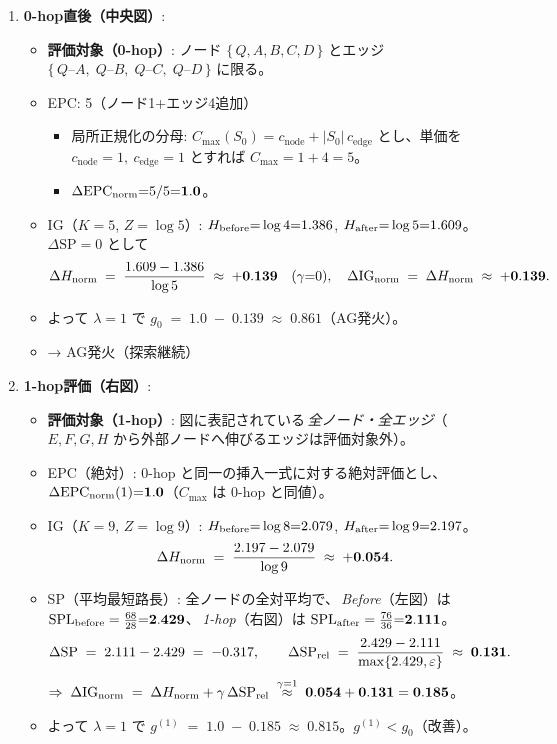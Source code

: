 \documentclass[ja=standard,xelatex]{bxjsarticle}
\begin{document}
\begin{enumerate}
  \item \textbf{0-hop直後（中央図）}: 
  \begin{itemize}
    \item \textbf{評価対象（0-hop）}: ノード $\{\,Q,A,B,C,D\,\}$ とエッジ $\{\,Q\text{--}A,\;Q\text{--}B,\;Q\text{--}C,\;Q\text{--}D\,\}$ に限る。
    \item EPC: 5（ノード1+エッジ4追加）
    \begin{itemize}
      \item 局所正規化の分母: $C_{\max}(S_0)=c_{\mathrm{node}}+|S_0|\,c_{\mathrm{edge}}$ とし、単価を $c_{\mathrm{node}}{=}1,\ c_{\mathrm{edge}}{=}1$ とすれば $C_{\max}{=}1{+}4{=}5$。
      \item $\Delta\mathrm{EPC}_{\rm norm}{=}{5}/{5}{=}\mathbf{1.0}$。
    \end{itemize}
    \item IG（$K{=}5$, $Z{=}\log 5$）: $H_{\rm before}{=}\log 4{=}1.386$, $H_{\rm after}{=}\log 5{=}1.609$。$\Delta\mathrm{SP}{=}0$ として
      \[
        \Delta H_{\rm norm}\;=\;\frac{1.609-1.386}{\log 5}\;\approx\;\mathbf{+0.139}\quad(\gamma{=}0),\quad
        \Delta\mathrm{IG}_{\rm norm}\;=\;\Delta H_{\rm norm}\;\approx\;\mathbf{+0.139}.
      \]
    \item よって $\lambda{=}1$ で $g_0\;=\;1.0\; -\;0.139\;\approx\;\mathbf{0.861}$（AG発火）。
    \item → AG発火（探索継続）
  \end{itemize}
  \item \textbf{1-hop評価（右図）}:
  \begin{itemize}
    \item \textbf{評価対象（1-hop）}: 図に表記されている\,\emph{全ノード・全エッジ}（$E,F,G,H$ から外部ノードへ伸びるエッジは評価対象外）。
    \item EPC（絶対）: 0-hop と同一の挿入一式に対する絶対評価とし、$\Delta\mathrm{EPC}_{\rm norm}(1){=}\mathbf{1.0}$（$C_{\max}$ は 0-hop と同値）。
    \item IG（$K{=}9$, $Z{=}\log 9$）: $H_{\rm before}{=}\log 8{=}2.079$, $H_{\rm after}{=}\log 9{=}2.197$。
      \[
        \Delta H_{\rm norm}\;=\;\frac{2.197-2.079}{\log 9}\;\approx\;\mathbf{+0.054}.
      \]
    \item SP（平均最短路長）: 全ノードの全対平均で、\,\emph{Before}（左図）は $\mathrm{SPL}_{\rm before}=\tfrac{68}{28}{=}\mathbf{2.429}$、\,\emph{1-hop}（右図）は $\mathrm{SPL}_{\rm after}=\tfrac{76}{36}{=}\mathbf{2.111}$。
      \[
        \Delta\mathrm{SP}\;=\;2.111-2.429\;=\;-0.317,\qquad
        \Delta\mathrm{SP}_{\rm rel}\;=\;\frac{2.429-2.111}{\max\{2.429,\varepsilon\}}\;\approx\;\mathbf{0.131}.
      \]
      $\Rightarrow\;\Delta\mathrm{IG}_{\rm norm}\;=\;\Delta H_{\rm norm}+\gamma\,\Delta\mathrm{SP}_{\rm rel}\;\stackrel{\gamma=1}{\approx}\;\mathbf{0.054+0.131=0.185}$。
    \item よって $\lambda{=}1$ で $g^{(1)}\;=\;1.0\; -\;0.185\;\approx\;\mathbf{0.815}$。\;$g^{(1)}<g_0$（改善）。
  \end{itemize}
\end{enumerate}
\end{document}
